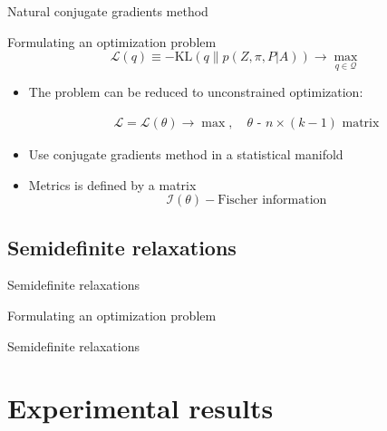 \documentclass{beamer}
\theoremstyle{definition}
\theoremstyle{plain}
\theoremstyle{remark}
\begin{document}
			\begin{frame}{Natural conjugate gradients method} %
				\begin{block}{Formulating an optimization problem}
                    \begin{equation*}
                        \mathcal L(q) \equiv -\text{KL}\left(q \| p(Z, \pi, P | A)\right) \longrightarrow \max\limits_{q \in \mathcal Q}
                    \end{equation*}
				\end{block}
                \begin{itemize}
				    \item The problem can be reduced to unconstrained optimization:

                        \begin{equation}
                            \begin{aligned}
                            \nonumber
                            \mathcal L = \mathcal L(\theta) \longrightarrow \max, \quad \text{$\theta$ - $n\times(k-1)$ matrix}
                            \end{aligned}
                        \end{equation}

                    \item Use conjugate gradients method in a statistical manifold
                    \item Metrics is defined by a matrix
                        \[
                            \mathcal I(\theta) - \text{Fischer information}
                        \]
                \end{itemize}                
			\end{frame}

		\subsection{Semidefinite relaxations}
			\begin{frame}{Semidefinite relaxations}
				\begin{block}{Formulating an optimization problem}
				\end{block}
			\end{frame}

			\begin{frame}{Semidefinite relaxations}
				
			\end{frame}

	\section{Experimental results}
		\begin{frame}{}
				
		\end{frame}
\end{document}
